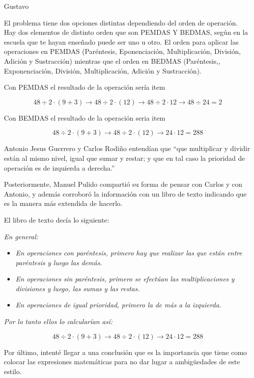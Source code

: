 \begin{opin}{\guscolor}{Gustavo}
\begin{mdframed}
El problema tiene dos opciones distintas dependiendo del orden de operación. Hay dos elementos de distinto orden que son PEMDAS Y BEDMAS, según en la escuela que te hayan enseñado puede ser uno u otro. El orden para aplicar las operaciones en PEMDAS (Paréntesis, Eponenciación, Multiplicación, División, Adición y Sustracción) mientras que el orden en BEDMAS (Paréntesis,, Exponenciación, División, Multiplicación, Adición y Sustracción). 

Con PEMDAS el resultado de la operación sería item 

\[
48÷2·(9+3) \to 48 ÷ 2·(12) \to 48÷2·12 \to 48÷24 = 2
\]

Con BEMDAS  el resultado de la operación seria item 

\[
48÷2·(9+3) \to 48 ÷ 2·(12) \to 24·12 = 288
\]

\end{mdframed}

Antonio Jesus Guerrero y Carlos Rodiño entendían que “que multiplicar y dividir están al mismo nivel, igual que sumar y restar; y que en tal caso la prioridad de operación es de izquierda a derecha.”

Posteriormente, Manuel Pulido compartió su forma de pensar con Carlos y con Antonio,  y además corroboró la información con un libro de texto indicando que es la manera más extendida de hacerlo.

El libro de texto decía lo siguiente:

\textit{En general:}

\begin{itemize}
\item \textit{En operaciones con paréntesis, primero hay que realizar las que están entre paréntesis y luego las demás.}
\item \textit{En operaciones sin paréntesis, primero se efectúan las multiplicaciones y divisiones y luego, las sumas y las restas.}
\item \textit{En operaciones de igual prioridad, primero la de más a la izquierda.}
\end{itemize}

\textit{Por lo tanto ellos lo calcularían así:}

\[
48÷2·(9+3) \to 48 ÷ 2·(12) \to 24·12 = 288
\]



Por último, intenté llegar a una conclusión que es la importancia que tiene como colocar las expresiones matemáticas para no dar lugar a ambigüedades de este estilo.



\end{opin}
